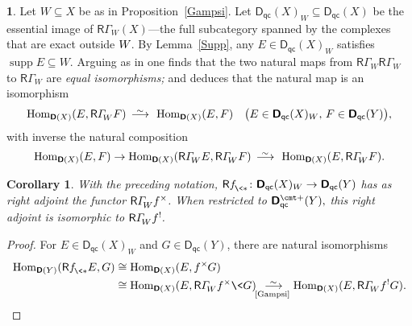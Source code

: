 \documentclass{compositio}
\theoremstyle{plain}
\newtheorem{subcor}[equation]{Corollary}
\theoremstyle{definition}
\newtheorem{cosa}[thm]{}
\theoremstyle{remark}
\numberwithin{equation}{thm}
\begin{document}
\begin{cosa}
Let $W\subseteq X$ be as in Proposition~\ref{Gampsi}. Let ${{\boldsymbol{\mathsf{D}}}_{\mathsf{qc}}}{}(X)_{W}\subseteq{{\boldsymbol{\mathsf{D}}}_{\mathsf{qc}}}(X)$ be the essential image of 
${\mathsf R}{\varGamma}^{}_{\!W}(X)$---the full subcategory spanned by the complexes that are exact outside $W{\mkern-1mu}$. By Lemma~\ref{Supp}, any $E\in{{\boldsymbol{\mathsf{D}}}_{\mathsf{qc}}}(X)_W$ satisfies
$\operatorname{supp} E\subseteq W$. Arguing as in \cite[\S2.3]{AJS}  one finds that the two
natural maps from ${\mathsf R}{\varGamma}^{}_{\!W}{\mathsf R}{\varGamma}^{}_{\!W}$ to ${\mathsf R}{\varGamma}^{}_{\!W}$ are 
\emph{equal isomorphisms;} and deduces that 
the natural map is an isomorphism 
\[
\operatorname{Hom}_{{\boldsymbol{\mathsf{D}}}(X)}(E,{\mathsf R}{\varGamma}^{}_{\!W}F)
{{\mkern8mu\longrightarrow \mkern-25.5mu{}^\sim\mkern17mu}}\operatorname{Hom}_{{\boldsymbol{\mathsf{D}}}(X)}(E,F)
\quad \big(E\in{{\boldsymbol{\mathsf{D}}}_{\mathsf{qc}}}(X)_{W},\,F\in{{\boldsymbol{\mathsf{D}}}_{\mathsf{qc}}}(Y)\big),
\]
with inverse the natural composition 
\[
\operatorname{Hom}_{{\boldsymbol{\mathsf{D}}}(X)}(E,F)\to\operatorname{Hom}_{{\boldsymbol{\mathsf{D}}}(X)}({\mathsf R}{\varGamma}^{}_{\!W}E,{\mathsf R}{\varGamma}^{}_{\!W}F){{\mkern8mu\longrightarrow \mkern-25.5mu{}^\sim\mkern17mu}}
\operatorname{Hom}_{{\boldsymbol{\mathsf{D}}}(X)}(E,{\mathsf R}{\varGamma}^{}_{\!W}F).
\]

\begin{subcor}
\label{supports}
With the preceding notation, ${{\mathsf R} f^{}_{{\mkern-1mu}\<*}}\colon{{\boldsymbol{\mathsf{D}}}_{\mathsf{qc}}}{}(X)_{W}\to{{\boldsymbol{\mathsf{D}}}_{\mathsf{qc}}}(Y)$ has as right adjoint the functor\/ ${\mathsf R}{\varGamma}^{}_{\!W}f^\times{\mkern-1mu}$. 
When restricted to\/ ${{\boldsymbol{\mathsf{D}}}_{\mathsf{qc}}^{{\vbox to 0pt{\vskip-.95 ex\hbox{$\scriptstyle \text{\cmt\char'053}$}\vss}}}}(Y),$ this right adjoint is isomorphic to\/ 
${\mathsf R}{\varGamma}^{}_{\!W}f^!{\mkern-1mu}$.
\end{subcor}

\begin{proof}
For $E\in{{\boldsymbol{\mathsf{D}}}_{\mathsf{qc}}}(X)_{W}$ and $G\in{{\boldsymbol{\mathsf{D}}}_{\mathsf{qc}}}(Y)$, there are natural isomorphisms
\begin{align*}
\operatorname{Hom}_{{\boldsymbol{\mathsf{D}}}(Y)}({{\mathsf R} f^{}_{{\mkern-1mu}\<*}} E,G)
&\cong
\operatorname{Hom}_{{\boldsymbol{\mathsf{D}}}(X)}(E,f^\times{\mkern-1mu} G)\\
&\cong 
\operatorname{Hom}_{{\boldsymbol{\mathsf{D}}}(X)}(E,{\mathsf R}{\varGamma}^{}_{\!W}f^\times\<G)
\underset{\!\textup{\ref{Gampsi}}\,}{{\mkern8mu\longrightarrow \mkern-25.5mu{}^\sim\mkern17mu}} 
\operatorname{Hom}_{{\boldsymbol{\mathsf{D}}}(X)}(E,{\mathsf R}{\varGamma}^{}_{\!W}f^!G). 
\end{align*}
\end{proof}


\end{cosa}
\end{document}
